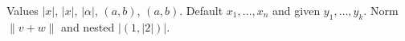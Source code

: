 \newcommand{\abs}[1]{|#1|}
\newcommand{\pair}[2]{(#1, #2)}
\newcommand{\vect}[2][n]{#2_1, \dots, #2_#1}
\def\norm#1{\|#1\|}
Values $\abs{x}$, $\abs x$, $\abs\alpha$, $\pair{a}{b}$, $\pair a b$.
Default $\vect{x}$ and given $\vect[k]{y}$.
Norm $\norm{v + w}$ and nested $\abs{\pair{1}{\abs{2}}}$.
